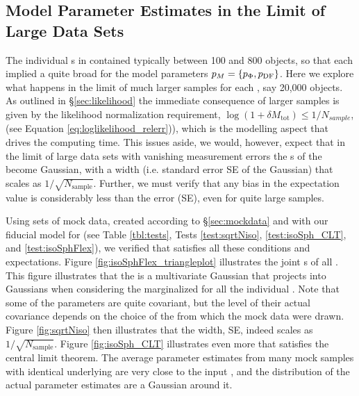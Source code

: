 \subsection{Model Parameter Estimates in the Limit of Large Data Sets} \label{sec:largedata}

The individual \MAP{}s in \citet{bov13} contained typically between 100 and 800 objects, so that each \MAP{} implied a quite broad \pdf{} for the model parameters $p_M{}=\{p_\Phi,p_\text{DF}\}$. Here we explore what happens in the limit of much larger samples for each \MAP{}, say 20,000 objects. As outlined in \S\ref{sec:likelihood} the immediate consequence of larger samples is given by the likelihood normalization requirement, $\log(1+\delta M_\text{tot})\le 1/N_{sample}$, (see Equation \ref{eq:loglikelihood_relerr})), which is the modelling aspect that drives the computing time. This issues aside, we would, however, expect that in the limit of large data sets with vanishing measurement errors the \pdf{}s of the \pmodel{} become Gaussian, with a \pdf{} width (i.e. standard error SE of the Gaussian) that scales as $1/\sqrt{N_\text{sample}}$. Further, we must verify that any bias in the \pdf{} expectation value is considerably less than the error (SE), even for quite large samples.

Using sets of mock data, created according to \S\ref{sec:mockdata} and with our fiducial model for \pmodel{} (see Table \ref{tbl:tests}, Tests \ref{test:sqrtNiso}, \ref{test:isoSph_CLT}, and \ref{test:isoSphFlex}), we verified that \RM{} satisfies all these conditions and expectations. Figure \ref{fig:isoSphFlex_triangleplot} illustrates the joint \pdf{}s of all \pmodel{}. This figure illustrates that the \pdf{} is a multivariate Gaussian that projects into Gaussians when considering the marginalized \pdf{} for all the individual \pmodel{}. Note that some of the parameters are quite covariant, but the level of their actual covariance depends on the choice of the \pmodel{} from which the mock data were drawn. Figure \ref{fig:sqrtNiso} then illustrates that the \pdf{} width, SE, indeed scales as $1/\sqrt{N_\text{sample}}$. Figure \ref{fig:isoSph_CLT} illustrates even more that \RM{} satisfies the central limit theorem. The average parameter estimates from many mock samples with identical underlying \pmodel{} are very close to the input \pmodel{}, and the distribution of the actual parameter estimates are a Gaussian around it. 


